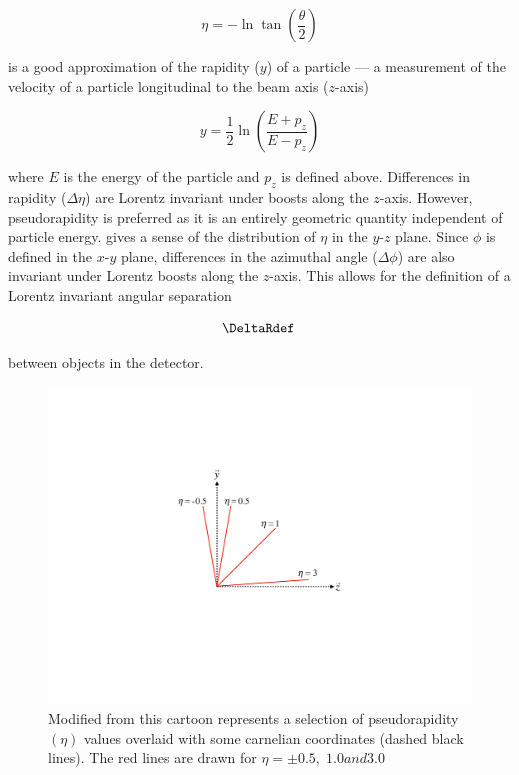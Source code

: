 \begin{equation}
 \eta = -\ln \tan \left( \frac{\theta}{2} \right)
\end{equation}

is a good approximation of the rapidity ($y$) of a particle --- a measurement of
the velocity of a particle longitudinal to the beam axis ($z$-axis)

\begin{equation}
y = \frac{1}{2} \ln \left( \frac{E + p_{z}}{E - p_{z}} \right)
\end{equation}

where $E$ is the energy of the particle and $p_{z}$ is defined above.
Differences in rapidity ($\Delta\eta$) are Lorentz invariant under boosts along
the $z$-axis.  However, pseudorapidity is preferred as it is an entirely
geometric quantity independent of particle energy. 
gives a sense of the distribution of $\eta$ in the $y$-$z$ plane. Since $\phi$
is defined in the $x$-$y$ plane, differences in the azimuthal angle
($\Delta\phi$) are also invariant under Lorentz boosts along the $z$-axis.
This allows for the definition of a Lorentz invariant angular separation

\begin{equation}
 \DeltaRdef \,
\end{equation}

between objects in the detector.

\begin{figure}[!htbp]
  \begin{center}
    \includegraphics[width=0.5\linewidth]{figures/atlas/pseudorapidity}
    \caption{Modified from \cite{Stark:2317296} this cartoon represents a
selection of pseudorapidity $(\eta)$ values overlaid with some carnelian
coordinates (dashed black lines).  The red lines are drawn for $\eta = \pm
0.5, \; 1.0 and3.0$ }
    \label{fig:pseudorapidity}
  \end{center}
\end{figure}

